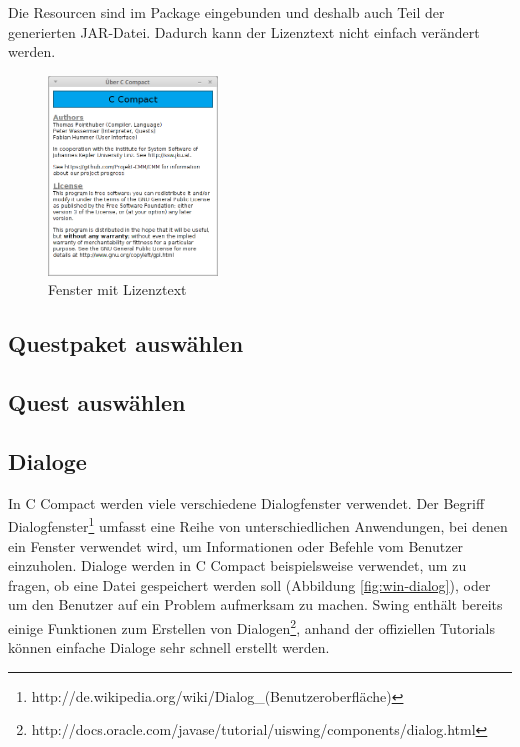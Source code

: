 Die Resourcen sind im Package eingebunden und deshalb auch Teil der generierten JAR-Datei. Dadurch kann der Lizenztext nicht einfach verändert werden.

\begin{figure}[htp]
\centering
\includegraphics[width=0.4\textwidth]{./media/images/gui/elements/Bildschirmfoto-About.png}
\caption{Fenster mit Lizenztext}
\label{fig:win-about}
\end{figure}

\subsection{Questpaket auswählen}


\subsection{Quest auswählen}


\subsection{Dialoge}
\label{sec:win-dialog}
In C Compact werden viele verschiedene Dialogfenster verwendet. Der Begriff Dialogfenster\footnote{http://de.wikipedia.org/wiki/Dialog\_(Benutzeroberfläche)} umfasst eine Reihe von unterschiedlichen Anwendungen, bei denen ein Fenster verwendet wird, um Informationen oder Befehle vom Benutzer einzuholen. Dialoge werden in C Compact beispielsweise verwendet, um zu fragen, ob eine Datei gespeichert werden soll (Abbildung \ref{fig:win-dialog}), oder um den Benutzer auf ein Problem aufmerksam zu machen. Swing enthält bereits einige Funktionen zum Erstellen von Dialogen\footnote{http://docs.oracle.com/javase/tutorial/uiswing/components/dialog.html}, anhand der offiziellen Tutorials können einfache Dialoge sehr schnell erstellt werden.

